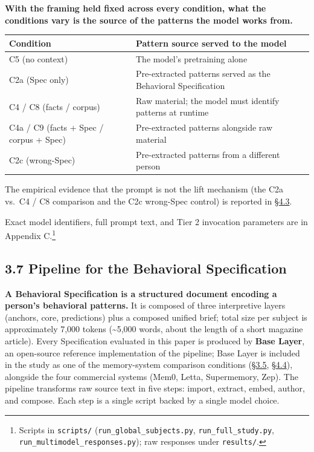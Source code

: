 \textbf{With the framing held fixed across every condition, what the
conditions vary is the source of the patterns the model works from.}

\begin{longtable}[]{@{}
  >{\raggedright\arraybackslash}p{}
  >{\raggedright\arraybackslash}p{}@{}}
\toprule
Condition & Pattern source served to the model \\
\midrule
\endhead
C5 (no context) & The model's pretraining alone \\
C2a (Spec only) & Pre-extracted patterns served as the Behavioral
Specification \\
C4 / C8 (facts / corpus) & Raw material; the model must identify
patterns at runtime \\
C4a / C9 (facts + Spec / corpus + Spec) & Pre-extracted patterns
alongside raw material \\
C2c (wrong-Spec) & Pre-extracted patterns from a different person \\
\bottomrule
\end{longtable}

The empirical evidence that the prompt is not the lift mechanism (the
C2a vs.~C4 / C8 comparison and the C2c wrong-Spec control) is reported
in \hyperref[mechanism-correct-content-not-format]{§4.3}.

Exact model identifiers, full prompt text, and Tier 2 invocation
parameters are in Appendix C.\footnote{Scripts in \texttt{scripts/}
  (\texttt{run\_global\_subjects.py}, \texttt{run\_full\_study.py},
  \texttt{run\_multimodel\_responses.py}); raw responses under
  \texttt{results/}.}

\hypertarget{pipeline-for-the-behavioral-specification}{%
\subsection{3.7 Pipeline for the Behavioral
Specification}\label{pipeline-for-the-behavioral-specification}}

\textbf{A Behavioral Specification is a structured document encoding a
person's behavioral patterns.} It is composed of three interpretive
layers (anchors, core, predictions) plus a composed unified brief; total
size per subject is approximately 7,000 tokens (\textasciitilde5,000
words, about the length of a short magazine article). Every
Specification evaluated in this paper is produced by \textbf{Base
Layer}, an open-source reference implementation of the pipeline; Base
Layer is included in the study as one of the memory-system comparison
conditions (\hyperref[question-battery-formation]{§3.5}, \hyperref[memory-system-composition]{§4.4}), alongside the four commercial systems (Mem0,
Letta, Supermemory, Zep). The pipeline transforms raw source text in
five steps: import, extract, embed, author, and compose. Each step is a
single script backed by a single model choice.

